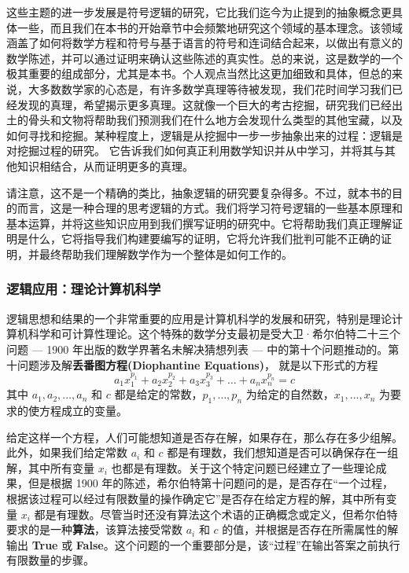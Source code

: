 这些主题的进一步发展是符号逻辑的研究，它比我们迄今为止提到的抽象概念更具体一些，而且我们在本书的开始章节中会频繁地研究这个领域的基本理念。该领域涵盖了如何将数学方程和符号与基于语言的符号和连词结合起来，以做出有意义的数学陈述，并可以通过证明来确认这些陈述的真实性。总的来说，这是数学的一个极其重要的组成部分，尤其是本书。个人观点当然比这更加细致和具体，但总的来说，大多数数学家的心态是，有许多数学真理等待被发现，我们花时间学习我们已经发现的真理，希望揭示更多真理。这就像一个巨大的考古挖掘，研究我们已经出土的骨头和文物将帮助我们预测我们在什么地方会发现什么类型的其他宝藏，以及如何寻找和挖掘。某种程度上，逻辑是从挖掘中一步一步抽象出来的过程：逻辑是对挖掘过程的研究。 它告诉我们如何真正利用数学知识并从中学习，并将其与其他知识相结合，从而证明更多的真理。

请注意，这不是一个精确的类比，抽象逻辑的研究要复杂得多。不过，就本书的目的而言，这是一种合理的思考逻辑的方式。我们将学习符号逻辑的一些基本原理和基本运算，并将这些知识应用到我们撰写证明的研究中。它将帮助我们真正理解证明是什么，它将指导我们构建要编写的证明，它将允许我们批判可能不正确的证明，并最终帮助我们理解数学作为一个整体是如何工作的。

\subsubsection*{逻辑应用：理论计算机科学}

逻辑思想和结果的一个非常重要的应用是计算机科学的发展和研究，特别是理论计算机科学和可计算性理论。这个特殊的数学分支最初是受大卫·希尔伯特二十三个问题 --- 1900 年出版的数学界著名未解决猜想列表 --- 中的第十个问题推动的。第十问题涉及解\textbf{丢番图方程(Diophantine Equations)}， 就是以下形式的方程
\[a_1x_1^{p_1}+a_2x_2^{p_2}+a_3x_3^{p_3}+\dots+a_nx_n^{p_n} = c\]
其中 $a_1, a_2, \dots, a_n$ 和 $c$ 都是给定的常数，$p_1, \dots, p_n$ 为给定的自然数，$x_1, \dots, x_n$ 为要求的使方程成立的变量。

给定这样一个方程，人们可能想知道是否存在解，如果存在，那么存在多少组解。 此外，如果我们给定常数 $a_i$ 和 $c$ 都是有理数，我们想知道是否可以确保存在一组解，其中所有变量 $x_i$ 也都是有理数。关于这个特定问题已经建立了一些理论成果，但是根据 1900 年的陈述，希尔伯特第十问题问的是，是否存在``一个过程，根据该过程可以经过有限数量的操作确定它''是否存在给定方程的解，其中所有变量 $x_i$ 都是有理数。尽管当时还没有算法这个术语的正确概念或定义，但希尔伯特要求的是一种\textbf{算法}，该算法接受常数 $a_i$ 和 $c$ 的值，并根据是否存在所需属性的解输出 \textbf{True} 或 \textbf{False}。这个问题的一个重要部分是，该``过程''在输出答案之前执行有限数量的步骤。

